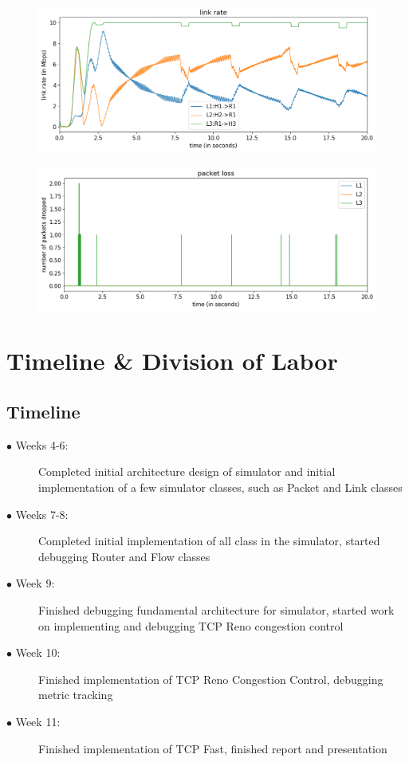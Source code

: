 \documentclass{article}
\begin{document}
\begin{figure}[H]
\centering
\includegraphics[width = \textwidth]{"test_case_custom link rate"}
\end{figure}

\begin{figure}[H]
\centering
\includegraphics[width = \textwidth]{"test_case_custom packet loss"}
\end{figure}


\section{Timeline \& Division of Labor}

\subsection{Timeline}

\begin{description}
  \item[$\bullet$ Weeks 4-6:] Completed initial architecture design of simulator and initial implementation of a few simulator classes, such as Packet and Link classes
  \item[$\bullet$ Weeks 7-8:] Completed initial implementation of all class in the simulator, started debugging Router and Flow classes 
  \item[$\bullet$ Week 9:] Finished debugging fundamental architecture for simulator, started work on implementing and debugging TCP Reno congestion control
  \item[$\bullet$ Week 10:] Finished implementation of TCP Reno Congestion Control, debugging metric tracking
  \item[$\bullet$ Week 11:] Finished implementation of TCP Fast, finished report and presentation
\end{description}
\end{document}
